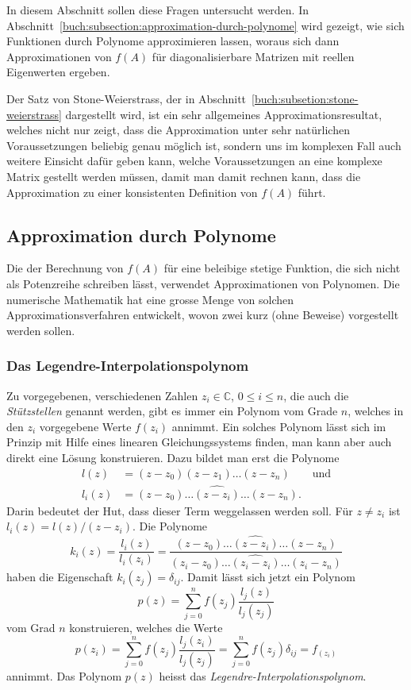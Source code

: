 In diesem Abschnitt sollen diese Fragen untersucht werden.
In Abschnitt~\ref{buch:subsection:approximation-durch-polynome}
wird gezeigt, wie sich Funktionen durch Polynome approximieren
lassen, woraus sich dann Approximationen von $f(A)$ für diagonalisierbare
Matrizen mit reellen Eigenwerten ergeben.

Der Satz von Stone-Weierstrass, der in
Abschnitt~\ref{buch:subsetion:stone-weierstrass} dargestellt wird,
ist ein sehr allgemeines Approximationsresultat, welches nicht nur
zeigt, dass die Approximation unter sehr natürlichen Voraussetzungen
beliebig genau möglich ist, sondern uns im komplexen Fall auch
weitere Einsicht dafür geben kann, welche Voraussetzungen an eine
komplexe Matrix gestellt werden müssen, damit man damit rechnen kann,
dass die Approximation zu einer konsistenten Definition von $f(A)$ führt.

%
%
\subsection{Approximation durch Polynome
\label{buch:subsection:approximation-durch-polynome}}
Die der Berechnung von $f(A)$ für eine beleibige stetige Funktion,
die sich nicht als Potenzreihe schreiben lässt, verwendet Approximationen
von Polynomen.
Die numerische Mathematik hat eine grosse Menge von solchen
Approximationsverfahren entwickelt, wovon zwei kurz (ohne Beweise)
vorgestellt werden sollen.

\subsubsection{Das Legendre-Interpolationspolynom}
Zu vorgegebenen, verschiedenen Zahlen $z_i\in\mathbb{C}$, $0\le i\le n$,
die auch die {\em Stützstellen} genannt werden,
gibt es immer ein Polynom vom Grade $n$, welches in den $z_i$ vorgegebene
Werte $f(z_i)$ annimmt.
Ein solches Polynom lässt sich im Prinzip mit Hilfe eines linearen
Gleichungssystems finden, man kann aber auch direkt eine Lösung
konstruieren.
Dazu bildet man erst die Polynome
\begin{align*}
l(z) &= (z-z_0)(z-z_1)\dots (z-z_n) \qquad\text{und}
\\
l_i(z) &= (z-z_0)\dots \widehat{(z-z_i)}\dots (z-z_n).
\end{align*}
Darin bedeutet der Hut, dass dieser Term weggelassen werden soll.
Für $z\ne z_i$ ist $l_i(z)=l(z)/(z-z_i)$.
Die Polynome
\[
k_i(z)
=
\frac{l_i(z)}{l_i(z_i)}
=
\frac{(z-z_0)\dots \widehat{(z-z_i)}\dots (z-z_n)}{(z_i-z_0)\dots \widehat{(z_i-z_i)}\dots (z_i-z_n)}
\]
haben die Eigenschaft
$k_i(z_j)=\delta_{ij}$.
Damit lässt sich jetzt ein Polynom
\[
p(z) = \sum_{j=0}^n f(z_j) \frac{l_j(z)}{l_j(z_j)}
\]
vom Grad $n$ konstruieren, welches die Werte
\[
p(z_i)
=
\sum_{j=0}^n f(z_j) \frac{l_j(z_i)}{l_j(z_j)}
=
\sum_{j=0}^n f(z_j) \delta_{ij}
=
f_(z_i)
\]
annimmt.
Das Polynom $p(z)$ heisst das {\em Legendre-Interpolationspolynom}.

